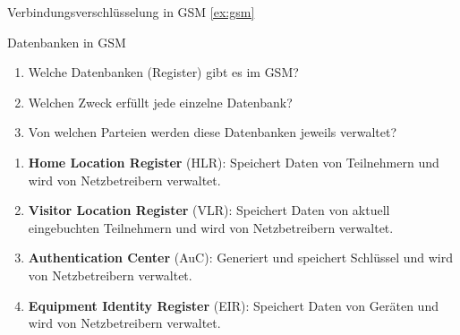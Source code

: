 \documentclass{article}
\begin{document}
\setcounter{subsection}{80}
\begin{exercise}{Verbindungsverschlüsselung in GSM \ref{ex:gsm}}\end{exercise}

\begin{exercise}{Datenbanken in GSM}
  \begin{enumerate}
    \item Welche Datenbanken (Register) gibt es im GSM?
    \item Welchen Zweck erfüllt jede einzelne Datenbank?
    \item Von welchen Parteien werden diese Datenbanken jeweils verwaltet?
  \end{enumerate}

  \begin{solution}
    \begin{enumerate}
      \item \textbf{Home Location Register} (HLR): Speichert Daten von Teilnehmern und wird von Netzbetreibern verwaltet.
      \item \textbf{Visitor Location Register} (VLR): Speichert Daten von aktuell eingebuchten Teilnehmern und wird von Netzbetreibern verwaltet.
      \item \textbf{Authentication Center} (AuC): Generiert und speichert Schlüssel und wird von Netzbetreibern verwaltet.
      \item \textbf{Equipment Identity Register} (EIR): Speichert Daten von Geräten und wird von Netzbetreibern verwaltet.
    \end{enumerate}
  \end{solution}
\end{exercise}
\end{document}

